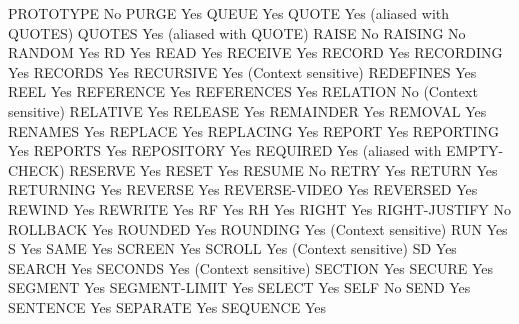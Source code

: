 PROTOTYPE                       No
PURGE                           Yes
QUEUE                           Yes
QUOTE                           Yes (aliased with QUOTES)
QUOTES                          Yes (aliased with QUOTE)
RAISE                           No
RAISING                         No
RANDOM                          Yes
RD                              Yes
READ                            Yes
RECEIVE                         Yes
RECORD                          Yes
RECORDING                       Yes
RECORDS                         Yes
RECURSIVE                       Yes (Context sensitive)
REDEFINES                       Yes
REEL                            Yes
REFERENCE                       Yes
REFERENCES                      Yes
RELATION                        No (Context sensitive)
RELATIVE                        Yes
RELEASE                         Yes
REMAINDER                       Yes
REMOVAL                         Yes
RENAMES                         Yes
REPLACE                         Yes
REPLACING                       Yes
REPORT                          Yes
REPORTING                       Yes
REPORTS                         Yes
REPOSITORY                      Yes
REQUIRED                        Yes (aliased with EMPTY-CHECK)
RESERVE                         Yes
RESET                           Yes
RESUME                          No
RETRY                           Yes
RETURN                          Yes
RETURNING                       Yes
REVERSE                         Yes
REVERSE-VIDEO                   Yes
REVERSED                        Yes
REWIND                          Yes
REWRITE                         Yes
RF                              Yes
RH                              Yes
RIGHT                           Yes
RIGHT-JUSTIFY                   No
ROLLBACK                        Yes
ROUNDED                         Yes
ROUNDING                        Yes (Context sensitive)
RUN                             Yes
S                               Yes
SAME                            Yes
SCREEN                          Yes
SCROLL                          Yes (Context sensitive)
SD                              Yes
SEARCH                          Yes
SECONDS                         Yes (Context sensitive)
SECTION                         Yes
SECURE                          Yes
SEGMENT                         Yes
SEGMENT-LIMIT                   Yes
SELECT                          Yes
SELF                            No
SEND                            Yes
SENTENCE                        Yes
SEPARATE                        Yes
SEQUENCE                        Yes
